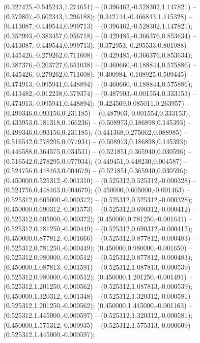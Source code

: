  (0.327425,-0.545243,1.274651) -- (0.396462,-0.528302,1.147821) -- (0.379807,-0.602343,1.296188);
 (0.342744,-0.466843,1.115328) -- (0.413087,-0.449544,0.999713) -- (0.396462,-0.528302,1.147821);
 (0.357993,-0.383457,0.956718) -- (0.429485,-0.366376,0.853634) -- (0.413087,-0.449544,0.999713);
 (0.372953,-0.295533,0.801088) -- (0.445426,-0.279262,0.711608) -- (0.429485,-0.366376,0.853634);
 (0.387376,-0.203727,0.651038) -- (0.460660,-0.188844,0.575886) -- (0.445426,-0.279262,0.711608);
 (0.400984,-0.108925,0.509445) -- (0.474913,-0.095941,0.448894) -- (0.460660,-0.188844,0.575886);
 (0.413482,-0.012238,0.379374) -- (0.487903,-0.001554,0.333153) -- (0.474913,-0.095941,0.448894);
 (0.424569,0.085011,0.263957) -- (0.499346,0.093156,0.231185) -- (0.487903,-0.001554,0.333153);
 (0.433953,0.181318,0.166236) -- (0.508973,0.186898,0.145393) -- (0.499346,0.093156,0.231185);
 (0.441368,0.275062,0.088985) -- (0.516542,0.278295,0.077934) -- (0.508973,0.186898,0.145393);
 (0.446588,0.364575,0.034531) -- (0.521851,0.365940,0.030596) -- (0.516542,0.278295,0.077934);
 (0.449451,0.448230,0.004587) -- (0.524756,0.448463,0.004679) -- (0.521851,0.365940,0.030596);
 (0.450000,0.525312,-0.001310) -- (0.525312,0.525312,-0.000328) -- (0.524756,0.448463,0.004679);
 (0.450000,0.605000,-0.001463) -- (0.525312,0.605000,-0.000372) -- (0.525312,0.525312,-0.000328);
 (0.450000,0.690312,-0.001573) -- (0.525312,0.690312,-0.000412) -- (0.525312,0.605000,-0.000372);
 (0.450000,0.781250,-0.001641) -- (0.525312,0.781250,-0.000449) -- (0.525312,0.690312,-0.000412);
 (0.450000,0.877812,-0.001666) -- (0.525312,0.877812,-0.000483) -- (0.525312,0.781250,-0.000449);
 (0.450000,0.980000,-0.001650) -- (0.525312,0.980000,-0.000512) -- (0.525312,0.877812,-0.000483);
 (0.450000,1.087813,-0.001591) -- (0.525312,1.087813,-0.000539) -- (0.525312,0.980000,-0.000512);
 (0.450000,1.201250,-0.001491) -- (0.525312,1.201250,-0.000562) -- (0.525312,1.087813,-0.000539);
 (0.450000,1.320312,-0.001348) -- (0.525312,1.320312,-0.000581) -- (0.525312,1.201250,-0.000562);
 (0.450000,1.445000,-0.001163) -- (0.525312,1.445000,-0.000597) -- (0.525312,1.320312,-0.000581);
 (0.450000,1.575312,-0.000935) -- (0.525312,1.575313,-0.000609) -- (0.525312,1.445000,-0.000597);
